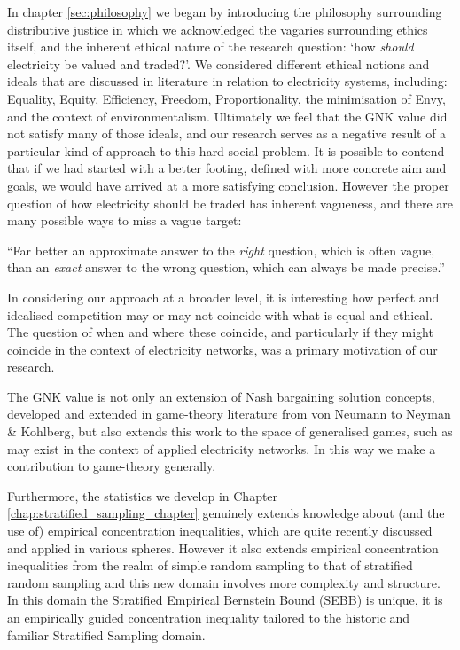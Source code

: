 In chapter \ref{sec:philosophy} we began by introducing the philosophy surrounding distributive justice in which we acknowledged the vagaries surrounding ethics itself, and the inherent ethical nature of the research question: `how \textit{should} electricity be valued and traded?'.
We considered different ethical notions and ideals that are discussed in literature in relation to electricity systems, including: Equality, Equity, Efficiency, Freedom, Proportionality, the minimisation of Envy, and the context of environmentalism.
Ultimately we feel that the GNK value did not satisfy many of those ideals, and our research serves as a negative result of a particular kind of approach to this hard social problem.
It is possible to contend that if we had started with a better footing, defined with more concrete aim and goals, we would have arrived at a more satisfying conclusion.
However the proper question of how electricity should be traded has inherent vagueness, and there are many possible ways to miss a vague target:

\begin{displayquote}
``Far better an approximate answer to the \textit{right} question, which is often vague, than an \textit{exact} answer to the wrong question, which can always be made precise.'' \cite{10.2307/2237638}
\end{displayquote}

In considering our approach at a broader level, it is interesting how perfect and idealised competition may or may not coincide with what is equal and ethical.
The question of when and where these coincide, and particularly if they might coincide in the context of electricity networks, was a primary motivation of our research.

The GNK value is not only an extension of Nash bargaining solution concepts, developed and extended in game-theory literature from von Neumann to Neyman \& Kohlberg, but also extends this work to the space of generalised games, such as may exist in the context of applied electricity networks.
In this way we make a contribution to game-theory generally.

Furthermore, the statistics we develop in Chapter \ref{chap:stratified_sampling_chapter} genuinely extends knowledge about (and the use of) empirical concentration inequalities, which are quite recently discussed and applied in various spheres. However it also extends empirical concentration inequalities from the realm of simple random sampling to that of stratified random sampling and this new domain involves more complexity and structure.
In this domain the Stratified Empirical Bernstein Bound (SEBB) is unique, it is an empirically guided concentration inequality tailored to the historic and familiar Stratified Sampling domain.

